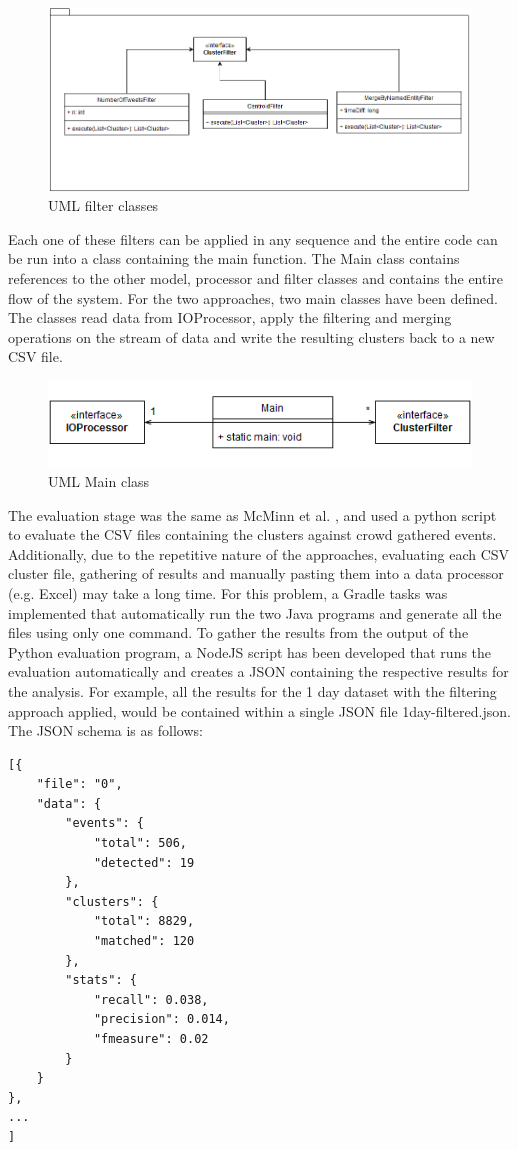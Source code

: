 \documentclass[a4paper,portrait,12pt]{article}
\begin{document}
\begin{figure}[h!]
	\centering
	\includegraphics[width=0.7\linewidth]{images/filterUML.png}
	\caption{UML filter classes}
	\label{fig:filterUML}
\end{figure}

Each one of these filters can be applied in any sequence and the entire code can be run into a class containing the main function.
The Main class contains references to the other model, processor and filter classes and contains the entire flow of the system.
For the two approaches, two main classes have been defined.
The classes read data from IOProcessor, apply the filtering and merging operations on the stream of data and write the resulting clusters back to a new CSV file.

\begin{figure}[h!]
	\centering
	\includegraphics[width=0.7\linewidth]{images/mainUML.png}
	\caption{UML Main class}
	\label{fig:mainUML}
\end{figure}

The evaluation stage was the same as McMinn et al. \cite{McMinn2013}, and used a python script to evaluate the CSV files containing the clusters against crowd gathered events.
Additionally, due to the repetitive nature of the approaches, evaluating each CSV cluster file, gathering of results and manually pasting them into a data processor (e.g. Excel) may take a long time.
For this problem, a Gradle tasks was implemented that automatically run the two Java programs and generate all the files using only one command.
To gather the results from the output of the Python evaluation program, a NodeJS script has been developed that runs the evaluation automatically and creates a JSON containing the respective results for the analysis.
For example, all the results for the 1 day dataset with the filtering approach applied, would be contained within a single JSON file 1day-filtered.json.
The JSON schema is as follows:
\begin{lstlisting}[caption=JSON Schema Example, label=json-schema]
[{
    "file": "0",
    "data": {
        "events": {
            "total": 506,
            "detected": 19
        },
        "clusters": {
            "total": 8829,
            "matched": 120
        },
        "stats": {
            "recall": 0.038,
            "precision": 0.014,
            "fmeasure": 0.02
        }
    }
},
...
]
\end{lstlisting}
\end{document}
